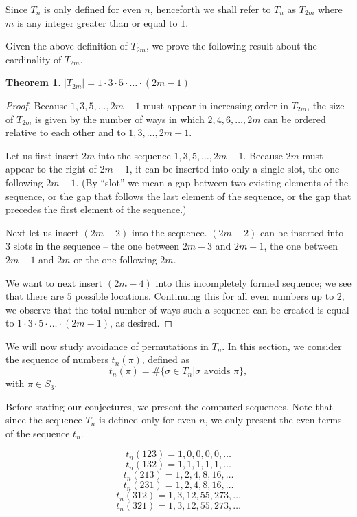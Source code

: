 \documentclass[11pt,letterpaper,twoside,english]{article}
\theoremstyle{theorem}
\newtheorem{theorem}{Theorem}
\theoremstyle{remark}
\begin{document}
Since $T_n$ is only defined for even $n$, henceforth we shall refer to $T_n$ as $T_{2m}$ where $m$ is any integer greater than or equal to $1$.

Given the above definition of $T_{2m}$, we prove the following result about the cardinality of $T_{2m}$.

\begin{theorem}
$|T_{2m}| = 1 \cdot 3 \cdot 5 \cdot \ldots \cdot (2m-1)$
\end{theorem}

\begin{proof}
Because $1,3,5,\ldots,2m-1$ must appear in increasing order in $T_{2m}$, the size of $T_{2m}$ is given by the number of ways in which $2, 4, 6, \ldots, 2m$ can be ordered relative to each other and to $1, 3, \ldots, 2m-1$.

Let us first insert $2m$ into the sequence $1,3,5,\ldots,2m-1$. Because $2m$ must appear to the right of $2m-1$, it can be inserted into only a single slot, the one following $2m-1$. (By ``slot'' we mean a gap between two existing elements of the sequence, or the gap that follows the last element of the sequence, or the gap that precedes the first element of the sequence.)

Next let us insert $(2m-2)$ into the sequence. $(2m-2)$ can be inserted into $3$ slots in the sequence -- the one between $2m-3$ and $2m-1$, the one between $2m-1$ and $2m$ or the one following $2m$.

We want to next insert $(2m-4)$ into this incompletely formed sequence; we see that there are $5$ possible locations. Continuing this for all even numbers up to $2$, we observe that the total number of ways such a sequence can  be created is equal to $1 \cdot 3 \cdot 5 \cdot \ldots \cdot (2m-1)$, as desired.
\end{proof}

We will now study avoidance of permutations in $T_n$. In this section, we consider the sequence of numbers $t_n(\pi)$, defined as 
\[t_n(\pi)=\#\{\sigma\in T_n|\sigma \text{ avoids } \pi\},\]
with $\pi\in S_3$.

Before stating our conjectures, we present the computed sequences. Note that since the sequence $T_n$ is defined only for even $n$, we only present the even terms of the sequence $t_n$.

$$t_n(123) = 1, 0, 0, 0, 0, \ldots$$
$$t_n(132) = 1, 1, 1, 1, 1, \ldots$$
$$t_n(213) = 1, 2, 4, 8, 16, \ldots$$
$$t_n(231) = 1, 2, 4, 8, 16, \ldots$$
$$t_n(312) = 1, 3, 12, 55, 273, \ldots$$
$$t_n(321) = 1, 3, 12, 55, 273, \ldots$$
\end{document}
